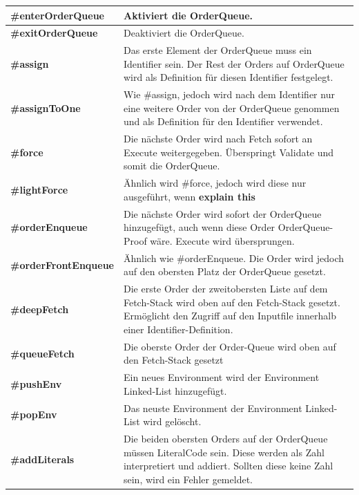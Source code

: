 \begin{table}[H]
    \centering
    \begin{tabularx}{\textwidth}{l|X}
    \textbf{\#enterOrderQueue}      & Aktiviert die OrderQueue. \\ \hline
    \textbf{\#exitOrderQueue}       & Deaktiviert die OrderQueue. \\ \hline
    \textbf{\#assign}               & Das erste Element der OrderQueue muss ein Identifier sein. Der Rest der Orders auf OrderQueue wird als Definition für diesen Identifier festgelegt. \\ \hline
    \textbf{\#assignToOne}          & Wie \#assign, jedoch wird nach dem Identifier nur eine weitere Order von der OrderQueue genommen und als Definition für den Identifier verwendet. \\ \hline
    \textbf{\#force}                & Die nächste Order wird nach Fetch sofort an Execute weitergegeben. Überspringt Validate und somit die OrderQueue. \\ \hline
    \textbf{\#lightForce}           & Ähnlich wird \#force, jedoch wird diese nur ausgeführt, wenn \textbf{explain this} \\ \hline
    \textbf{\#orderEnqueue}         & Die nächste Order wird sofort der OrderQueue hinzugefügt, auch wenn diese Order OrderQueue-Proof wäre. Execute wird übersprungen. \\ \hline
    \textbf{\#orderFrontEnqueue}    & Ähnlich wie \#orderEnqueue. Die Order wird jedoch auf den obersten Platz der OrderQueue gesetzt. \\ \hline
    \textbf{\#deepFetch}            & Die erste Order der zweitobersten Liste auf dem Fetch-Stack wird oben auf den Fetch-Stack gesetzt. Ermöglicht den Zugriff auf den Inputfile innerhalb einer Identifier-Definition. \\ \hline
    \textbf{\#queueFetch}           & Die oberste Order der Order-Queue wird oben auf den Fetch-Stack gesetzt \\ \hline 
    \textbf{\#pushEnv}              & Ein neues Environment wird der Environment Linked-List hinzugefügt. \\ \hline
    \textbf{\#popEnv}               & Das neuste Environment der Environment Linked-List wird gelöscht. \\ \hline
    \textbf{\#addLiterals}          & Die beiden obersten Orders auf der OrderQueue müssen LiteralCode sein. Diese werden als Zahl interpretiert und addiert. Sollten diese keine Zahl sein, wird ein Fehler gemeldet.        
    \end{tabularx}
\end{table}

